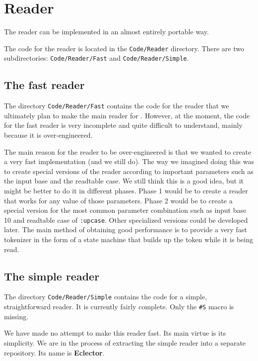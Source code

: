\chapter{Reader}

The reader can be implemented in an almost entirely portable way.  

The code for the reader is located in the \texttt{Code/Reader}
directory.  There are two subdirectories: \texttt{Code/Reader/Fast}
and \texttt{Code/Reader/Simple}.  

\section{The fast reader}

The directory \texttt{Code/Reader/Fast} contains the code for the
reader that we ultimately plan to make the main reader for \sysname{}.
However, at the moment, the code for the fast reader is very
incomplete and quite difficult to understand, mainly because it is
over-engineered.  

The main reason for the reader to be over-engineered is that we
wanted to create a very fast implementation (and we still do).  The
way we imagined doing this was to create special versions of the
reader according to important parameters such as the input base and
the readtable case.  We still think this is a good idea, but it might
be better to do it in different phases.  Phase 1 would be to create a
reader that works for any value of those parameters.  Phase 2 would be
to create a special version for the most common parameter combination
such as input base 10 and readtable case of \texttt{:upcase}.  Other
specialized versions could be developed later.  The main method of
obtaining good performance is to  provide a very fast tokenizer in the
form of a state machine that builds up the token while it is being
read.  

\section{The simple reader}

The directory \texttt{Code/Reader/Simple} contains the code for a
simple, straightforward reader.  It is currently fairly complete.
Only the \texttt{\#S} macro is missing.

We have made no attempt to make this reader fast.  Its main virtue is
its simplicity.  We are in the process of extracting the simple reader
into a separate repository.  Its name is \textbf{Eclector}.

